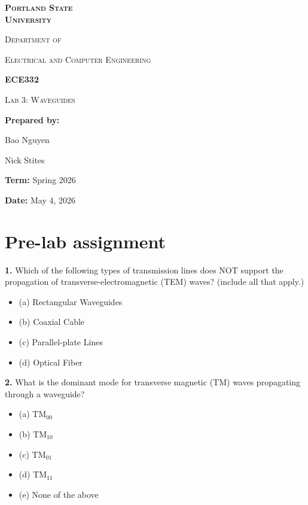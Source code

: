 \documentclass[11pt,letterpaper]{article}
\newcommand{\hl}[1]{\colorbox{answerhl}{#1}}
\begin{document}
\begin{titlepage}
\centering
\vspace*{2cm}
{\Huge\bfseries\scshape Portland State \\[2pt] University \par}
\vspace{1.5cm}
{\large\scshape Department of \par}
{\large\scshape Electrical and Computer Engineering \par}
\vspace{1.5cm}
{\LARGE\bfseries ECE332 \par}
\vspace{0.4cm}
{\LARGE\scshape Lab 3: Waveguides \par}
\vfill
{\large \textbf{Prepared by:} \par}
{\large Bao Nguyen \par}
{\large Nick Stites \par}
\vspace{1cm}
{\large \textbf{Term:} Spring 2026 \par}
\vspace{0.4cm}
{\large \textbf{Date:} May 4, 2026 \par}
\vspace{2cm}
\end{titlepage}

\thispagestyle{empty}
\tableofcontents
\newpage

\section{Pre-lab assignment}

\textbf{1.} Which of the following types of transmission lines does NOT support the propagation of transverse-electromagnetic (TEM) waves? (include all that apply.)
\begin{itemize}[label={},leftmargin=2em,itemsep=0pt]
  \item \hl{(a) Rectangular Waveguides}
  \item (b) Coaxial Cable
  \item (c) Parallel-plate Lines
  \item \hl{(d) Optical Fiber}
\end{itemize}

\textbf{2.} What is the dominant mode for transverse magnetic (TM) waves propagating through a waveguide?
\begin{itemize}[label={},leftmargin=2em,itemsep=0pt]
  \item (a) TM$_{00}$
  \item (b) TM$_{10}$
  \item (c) TM$_{01}$
  \item \hl{(d) TM$_{11}$}
  \item (e) None of the above
\end{itemize}
\end{document}
